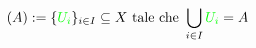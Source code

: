 \documentclass[preview]{standalone}
\begin{document}
\begin{align*}
(A) := \{\textcolor{green}{U_i}\}_{i \in I} \subseteq X \text{ tale che } \bigcup_{i \in I} \textcolor{green}{U_i} = A
\end{align*}
\end{document}
